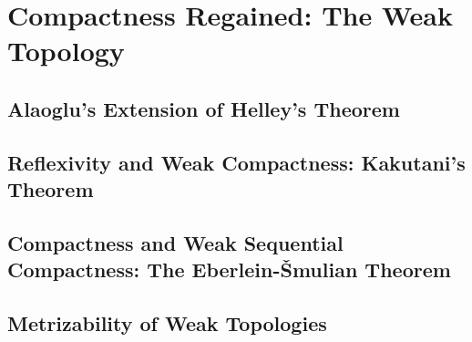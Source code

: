 \chapter{Compactness Regained: The Weak Topology}

\section{Alaoglu's Extension of Helley's Theorem}
\section{Reflexivity and Weak Compactness: Kakutani's Theorem}
\section{Compactness and Weak Sequential Compactness: The Eberlein-\v Smulian Theorem}
\section{Metrizability of Weak Topologies}
